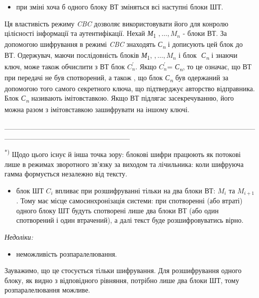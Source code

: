 \liststyleWWviiiNumxxvii
\begin{itemize}
\item при зміні хоча б одного блоку ВТ зміняться всі наступні блоки ШТ.
\end{itemize}
Ця властивість режиму \textit{CBC} дозволяє використовувати його для конролю
цілісності інформації та аутентифікації. Нехай \textit{М}\textsubscript{1}
${,\dots,M_{{n}}}$\textsubscript{ }{}- блоки ВТ. За
допомогою шифрування в режимі \textit{CBC }знаходять\textit{
С}\textit{\textsubscript{n}} і дописують цей блок до ВТ. Одержувач, маючи
послідовність блоків \textit{М}\textsubscript{1},
${,\dots,M_{{n}}}$\textsubscript{ }і блок $ $
\textit{С}\textit{\textsubscript{n}} і знаючи ключ, може також обчислити з ВТ
блок  ${{C}_{{n}}^{'}}$. Якщо  ${{C}_{{n}}^{'}}$=\textit{
С}\textit{\textsubscript{n}}, то це означає, що ВТ при передачі не був
спотворений, а також , що блок \textit{С}\textit{\textsubscript{n}} був
одержаний за допомогою того самого секретного ключа, що підтверджує авторство
відправника. Блок \textit{С}\textit{\textsubscript{n}} називають імітовставкою.
Якщо ВТ підлягає засекречуванню, його можна разом з імітовставкою зашифрувати
на іншому ключі.

\_\_\_\_\_\_\_\_\_\_\_\_\_\_\_\_\_\_\_\_\_\_\_\_\_\_\_\_\_\_\_\_\_\_\_\_\_\_\_\_\_\_\_\_\_\_\_\_\_\_\_\_\_\_\_\_\_\_\_\_\_\_\_\_\_\_\_\_\_\_\_\_

\textsuperscript{*) }Щодо цього існує й інша точка зору: блокові шифри працюють
як потокові лише в режимах зворотного зв’язку за виходом та лічильника:  коли
шифруюча гамма  формується незалежно від тексту.

\liststyleWWviiiNumxxvii
\begin{itemize}
\item блок ШТ  ${C_{{i}}}$ впливає  при розшифруванні тільки на два блоки ВТ: 
${M_{{i}}}$ та  ${M_{{i+1}}}$. Тому має місце самосинхронізація системи: при
спотворенні (або втраті) одного блоку ШТ будуть спотворені лише два блоки ВТ
(або один спотворений і один втрачений), а далі текст буде розшифровуватись
вірно.
\end{itemize}

\bigskip

{\itshape
Недоліки:}

\liststyleWWviiiNumxxvii
\begin{itemize}
\item неможливість розпаралелювання.
\end{itemize}
Зауважимо, що це стосується тільки шифрування. Для розшифрування одного блоку,
як видно з відповідного рівняння, потрібно лише два блоки ШТ, тому
розпаралелювання можливе.


